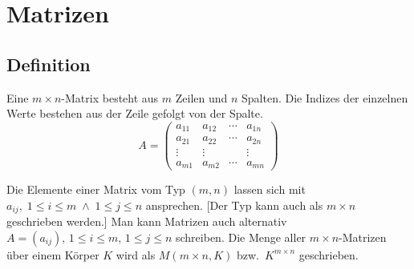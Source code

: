 \chapter{Matrizen}



\section{Definition}

Eine $m\times n$-Matrix besteht aus $m$ Zeilen und $n$ Spalten. Die Indizes der einzelnen Werte bestehen aus der Zeile gefolgt von der Spalte.
\[
A = \begin{pmatrix}
  a_{11} & a_{12} & \cdots & a_{1n}\\
  a_{21} & a_{22} & \cdots & a_{2n}\\
  \vdots & \vdots &        & \vdots\\
  a_{m1} & a_{m2} & \cdots & a_{mn}
\end{pmatrix}
\]

Die Elemente einer Matrix vom Typ $(m,n)$ lassen sich mit $a_{ij},\; 1\leq i\leq m \; \land \; 1\leq j\leq n$ ansprechen.
[Der Typ kann auch als $m\times n$ geschrieben werden.]
Man kann Matrizen auch alternativ $A=(a_{ij}),\, 1 \leq i \leq m,\, 1 \leq j \leq n$ schreiben.
Die Menge aller $m\times n$-Matrizen über einem Körper $K$ wird als $M(m\times n,K)$ bzw.~$K^{m\times n}$ geschrieben.

